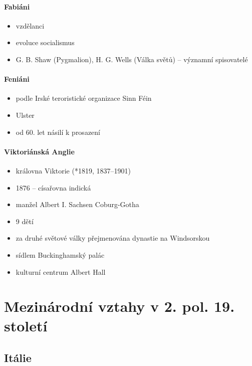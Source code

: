 \paragraph{Fabiáni}
\begin{itemize}
\item vzdělanci
\item evoluce \ra socialismus
\item G. B. Shaw (Pygmalion), H. G. Wells (Válka světů) -- významní spisovatelé
\end{itemize}

\paragraph{Feniáni}
\begin{itemize}
\item podle Irské teroristické organizace Sinn Féin
\item Ulster
\item od 60. let násilí k prosazení
\end{itemize}

\paragraph{Viktoriánská Anglie}
\begin{itemize}
\item královna Viktorie (*1819, 1837--1901)
\item 1876 -- císařovna indická
\item manžel Albert I. Sachsen Coburg-Gotha
\item 9 dětí
\item za druhé světové války přejmenována dynastie na Windsorskou
\item sídlem Buckinghamský palác
\item kulturní centrum Albert Hall
\end{itemize}

\section{Mezinárodní vztahy v 2. pol. 19. století}
\subsection{Itálie}
